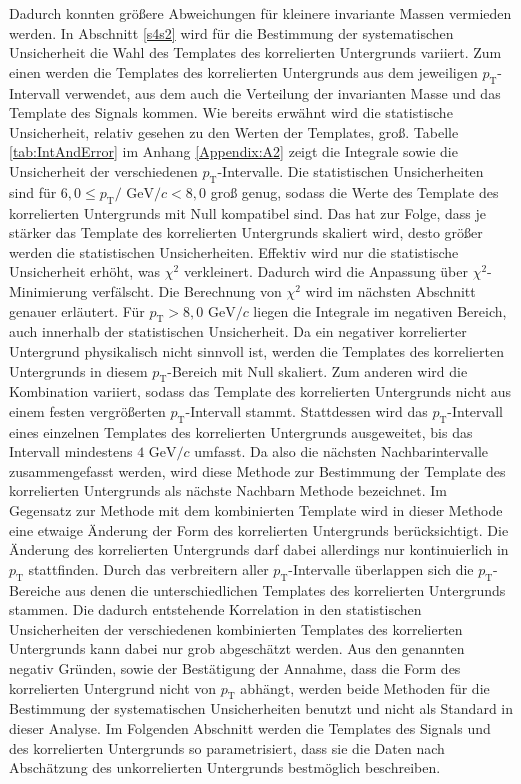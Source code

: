 Dadurch konnten größere Abweichungen für kleinere invariante Massen vermieden werden.
\newline
In Abschnitt \ref{s4s2} wird für die Bestimmung der systematischen Unsicherheit die Wahl des Templates des korrelierten Untergrunds variiert.
\newline
Zum einen werden die Templates des korrelierten Untergrunds aus dem jeweiligen $p_\text{T}$-Intervall verwendet, aus dem auch die Verteilung der invarianten Masse und das Template des Signals kommen.
Wie bereits erwähnt wird die statistische Unsicherheit, relativ gesehen zu den Werten der Templates, groß.
Tabelle \ref{tab:IntAndError} im Anhang \ref{Appendix:A2} zeigt die Integrale sowie die Unsicherheit der verschiedenen $p_\text{T}$-Intervalle.
Die statistischen Unsicherheiten sind für $6,0 \leq p_\text{T}/\text{ GeV}/c < 8,0 $ groß genug, sodass die Werte des Template des korrelierten Untergrunds mit Null kompatibel sind.
Das hat zur Folge, dass je stärker das Template des korrelierten Untergrunds skaliert wird, desto größer werden die statistischen Unsicherheiten.
Effektiv wird nur die statistische Unsicherheit erhöht, was $\chi^{2}$ verkleinert.
Dadurch wird die Anpassung über $\chi^{2}$-Minimierung verfälscht.
Die Berechnung von $\chi^{2}$ wird im nächsten Abschnitt genauer erläutert.
\newline
Für $p_\text{T} > 8,0 \text{ GeV}/c$ liegen die Integrale im negativen Bereich, auch innerhalb der statistischen Unsicherheit.
Da ein negativer korrelierter Untergrund physikalisch nicht sinnvoll ist, werden die Templates des korrelierten Untergrunds in diesem $p_\text{T}$-Bereich mit Null skaliert.
\newline
Zum anderen wird die Kombination variiert, sodass das Template des korrelierten Untergrunds nicht aus einem festen vergrößerten $p_\text{T}$-Intervall stammt.
Stattdessen wird das $p_\text{T}$-Intervall eines einzelnen Templates des korrelierten Untergrunds ausgeweitet, bis das Intervall mindestens $4\text{ GeV}/c$ umfasst.
Da also die nächsten Nachbarintervalle zusammengefasst werden, wird diese Methode zur Bestimmung der Template des korrelierten Untergrunds als nächste Nachbarn Methode bezeichnet.
Im Gegensatz zur Methode mit dem kombinierten Template wird in dieser Methode eine etwaige Änderung der Form des korrelierten Untergrunds berücksichtigt.
Die Änderung des korrelierten Untergrunds darf dabei allerdings nur kontinuierlich in $p_\text{T}$ stattfinden.
Durch das verbreitern aller $p_\text{T}$-Intervalle überlappen sich die $p_\text{T}$-Bereiche aus denen die unterschiedlichen Templates des korrelierten Untergrunds stammen.
Die dadurch entstehende Korrelation in den statistischen Unsicherheiten der verschiedenen kombinierten Templates des korrelierten Untergrunds kann dabei nur grob abgeschätzt werden. 
\newpage
\noindent
Aus den genannten negativ Gründen, sowie der Bestätigung der Annahme, dass die Form des korrelierten Untergrund nicht von $p_\text{T}$ abhängt, werden beide Methoden für die Bestimmung der systematischen Unsicherheiten benutzt und nicht als Standard in dieser Analyse.
\newline
Im Folgenden Abschnitt werden die Templates des Signals und des korrelierten Untergrunds so parametrisiert, dass sie die Daten nach Abschätzung des unkorrelierten Untergrunds bestmöglich beschreiben.